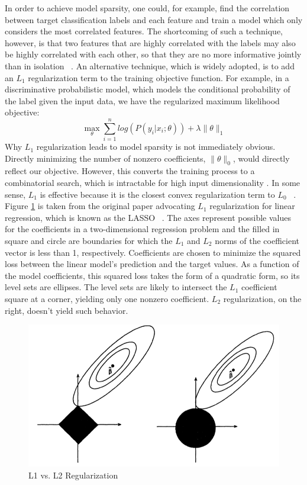 \documentclass[]{article}
\begin{document}
	In order to achieve model sparsity, one could, for example, find the correlation between target classification labels and each feature and train a model which only considers the most correlated features. The shortcoming of such a technique, however, is that two features that are highly correlated with the labels may also be highly correlated with each other, so that they are no more informative jointly than in isolation ~\cite{tibshirani1996regression}. An alternative technique, which is widely adopted, is to add an $L_1$ regularization term to the training objective function. For example, in a discriminative probabilistic model, which models the conditional probability of the label given the input data, we have the regularized maximum likelihood objective: 
	$$\max_{\theta} \sum_{i = 1}^n log\left(P(y_i | x_i; \theta)\right) + \lambda \lVert \theta \rVert_1$$
Why $L_1$ regularization leads to model sparsity is not immediately obvious. Directly minimizing the number of nonzero coefficients, $\lVert \theta \rVert_0$, would directly reflect our objective. However, this converts the training process to a combinatorial search, which is intractable for high input dimensionality . In some sense, $L_1$ is effective because it is the closest convex regularization term to $L_0$ ~\cite{LectureL1}. Figure \ref{fig:sparsity} is taken from the original paper advocating $L_1$ regularization for linear regression, which is known as the LASSO  ~\cite{tibshirani1996regression}. The axes represent possible values for the coefficients in a two-dimensional regression problem and the filled in square and circle are boundaries for which the $L_1$ and $L_2$ norms of the coefficient vector is less than 1, respectively. Coefficients are chosen to minimize the squared loss between the linear model's prediction and the target values. As a function of the model coefficients, this squared loss takes the form of a quadratic form, so its level sets are ellipses. The level sets are likely to intersect the $L_1$ coefficient square at a corner, yielding only one nonzero coefficient. $L_2$ regularization, on the right, doesn't yield such behavior. 
\begin{center}
\begin{figure}[!ht] 
\centering
\includegraphics[width=.5\textwidth]{../images/sparsity.png}
\caption{L1 vs. L2 Regularization}
\label{fig:sparsity}
\end{figure}
\end{center}
\end{document}

